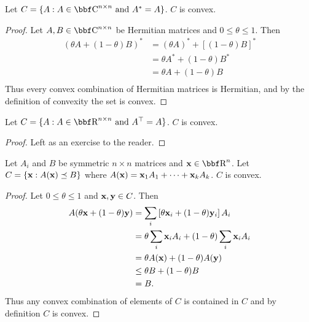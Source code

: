\documentclass{article}
\begin{document}
\begin{example}
    \label{ex:hermitian-convex}
    Let $C = \{A : A\in\CC^{n\times n} \text{ and } A^* = A\}$. $C$ is
    convex.
\end{example}
\begin{proof}
    Let $A,B\in\CC^{n\times n}$ be Hermitian matrices and $0\leq\theta\leq1$.
    Then
    \begin{align}
        (\theta A + (1-\theta) B)^* &= (\theta A)^* + \left[(1-\theta)B\right]^*\\
        &= \theta A^* + (1-\theta) B^*\\
        &= \theta A + (1-\theta) B \tag{because $A^*=A$ and $B^*=B$}\\
    \end{align}
    Thus every convex combination of Hermitian matrices is Hermitian,
    and by the definition of convexity the set is convex.
\end{proof}

\begin{example}
    Let $C = \{A : A\in\RR^{n\times n} \text{ and } A^\T = A\}$. $C$ is
    convex.
\end{example}
\begin{proof}
    Left as an exercise to the reader.
\end{proof}

\begin{example}
    Let $A_i$ and $B$ be symmetric $n\times n$ matrices and
    $\xx\in\RR^n$.
    Let $C = \{{\bf x} : A({\bf x}) \preceq B\}$ where $A({\bf x}) = {\bf x}_1A_1 +
    \dots + {\bf x}_kA_k$. $C$ is convex.
\end{example}
\begin{proof}
    Let $0\leq\theta\leq1$ and ${\bf x}, {\bf y} \in C$. Then
    \begin{align*}
        A(\theta{\bf x} + (1-\theta){\bf y}) &= \sum_i \left[ \theta{\bf x}_i + (1-\theta){\bf y}_i \right]A_i\\
        &= \theta\sum_i {\bf x}_i A_i + (1-\theta)\sum_i {\bf x}_i A_i\\
        &= \theta A({\bf x}) + (1-\theta) A({\bf y})\\
        &\leq \theta B + (1-\theta) B\\
        &= B.
    \end{align*}
    Thus any convex combination of elements of $C$ is contained
    in $C$ and by definition $C$ is convex.
\end{proof}
\end{document}
